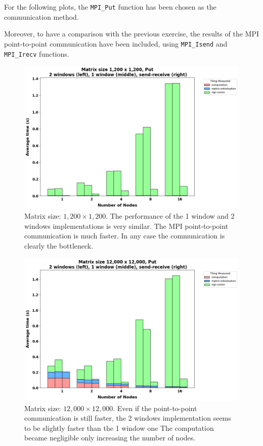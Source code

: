 \documentclass{article}
\begin{document}
    For the following plots, the \texttt{MPI\_Put} function has been chosen as the communication method.

    \noindent Moreover, to have a comparison with the previous exercise, the results of the MPI point-to-point communication have been included, using \texttt{MPI\_Isend} and \texttt{MPI\_Irecv} functions.


    \begin{figure}
        \includegraphics[width=\textwidth]{./images/1winvs2win-1200}
        \caption{Matrix size: $1,200 \times 1,200$. The performance of the 1 window and 2 windows implementations is very similar. The MPI point-to-point communication is much faster. In any case the communication is clearly the bottleneck.}
        \label{fig:figure5}
    \end{figure}

    \begin{figure}
        \includegraphics[width=\textwidth]{./images/1winvs2win-12k}
        \caption{Matrix size: $12,000 \times 12,000$. Even if the point-to-point communication is still faster, the 2 windows implementation seems to be slightly faster than the 1 window one The computation became negligible only increasing the number of nodes.}
        \label{fig:figure6}
    \end{figure}
\end{document}
